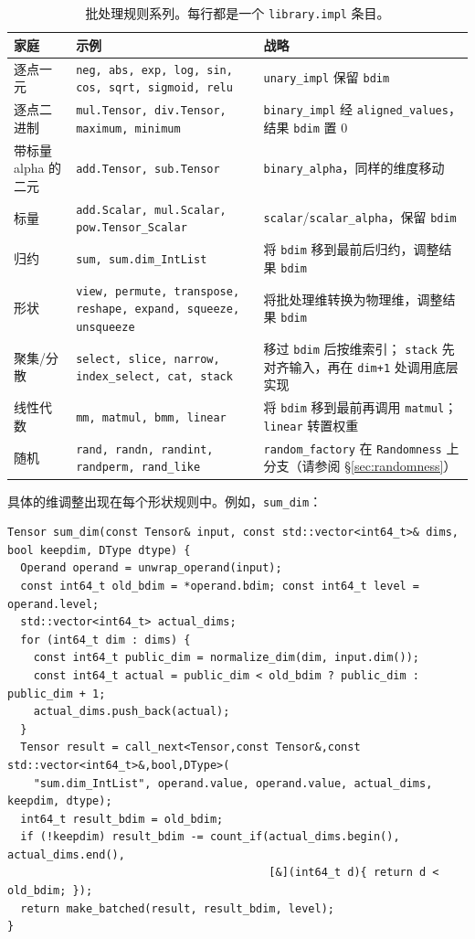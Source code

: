 \begin{table}[H]
\centering
\caption{批处理规则系列。每行都是一个 \texttt{library.impl} 条目。}
\label{tab:batchfamilies}
\small
\begin{tabular}{lll}
\toprule
家庭 & 示例 & 战略 \\
\midrule
逐点一元 & \texttt{neg, abs, exp, log, sin, cos, sqrt, sigmoid, relu} & \texttt{unary\_impl} 保留 \texttt{bdim} \\
逐点二进制 & \texttt{mul.Tensor, div.Tensor, maximum, minimum} & \texttt{binary\_impl} 经 \texttt{aligned\_values}，结果 \texttt{bdim} 置 0 \\
带标量 alpha 的二元 & \texttt{add.Tensor, sub.Tensor} & \texttt{binary\_alpha}，同样的维度移动 \\
标量 & \texttt{add.Scalar, mul.Scalar, pow.Tensor\_Scalar} & \texttt{scalar}/\texttt{scalar\_alpha}，保留 \texttt{bdim} \\
归约 & \texttt{sum, sum.dim\_IntList} & 将 \texttt{bdim} 移到最前后归约，调整结果 \texttt{bdim} \\
形状 & \texttt{view, permute, transpose, reshape, expand, squeeze, unsqueeze} & 将批处理维转换为物理维，调整结果 \texttt{bdim} \\
聚集/分散 & \texttt{select, slice, narrow, index\_select, cat, stack} & 移过 \texttt{bdim} 后按维索引； \texttt{stack} 先对齐输入，再在 \texttt{dim+1} 处调用底层实现 \\
线性代数 & \texttt{mm, matmul, bmm, linear} & 将 \texttt{bdim} 移到最前再调用 \texttt{matmul}； \texttt{linear} 转置权重 \\
随机 & \texttt{rand, randn, randint, randperm, rand\_like} & \texttt{random\_factory} 在 \texttt{Randomness} 上分支（请参阅 \S\ref{sec:randomness}） \\
\bottomrule
\end{tabular}
\end{table}

具体的维调整出现在每个形状规则中。例如，\texttt{sum\_dim}：

\begin{lstlisting}[caption={sum adjusts batch dim.}, label=lst:sumdim]
Tensor sum_dim(const Tensor& input, const std::vector<int64_t>& dims, bool keepdim, DType dtype) {
  Operand operand = unwrap_operand(input);
  const int64_t old_bdim = *operand.bdim; const int64_t level = operand.level;
  std::vector<int64_t> actual_dims;
  for (int64_t dim : dims) {
    const int64_t public_dim = normalize_dim(dim, input.dim());
    const int64_t actual = public_dim < old_bdim ? public_dim : public_dim + 1;
    actual_dims.push_back(actual);
  }
  Tensor result = call_next<Tensor,const Tensor&,const std::vector<int64_t>&,bool,DType>(
    "sum.dim_IntList", operand.value, operand.value, actual_dims, keepdim, dtype);
  int64_t result_bdim = old_bdim;
  if (!keepdim) result_bdim -= count_if(actual_dims.begin(), actual_dims.end(),
                                        [&](int64_t d){ return d < old_bdim; });
  return make_batched(result, result_bdim, level);
}
\end{lstlisting}

